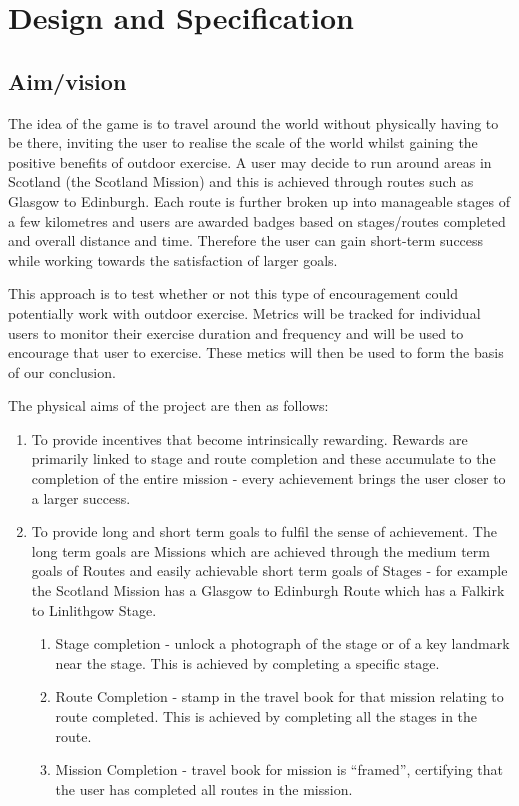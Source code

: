 \chapter{Design and Specification}\label{ch_method}

\section{Aim/vision}

The idea of the game is to travel around the world without physically
having to be there, inviting the user to realise the scale of the
world whilst gaining the positive benefits of outdoor exercise. A user
may decide to run around areas in Scotland (the Scotland Mission) and
this is achieved through routes such as Glasgow to Edinburgh. Each
route is further broken up into manageable stages of a few kilometres
and users are awarded badges based on stages/routes completed and
overall distance and time. Therefore the user can gain short-term
success while working towards the satisfaction of larger goals. 

This approach is to test whether or not this type of encouragement
could potentially work with outdoor exercise. Metrics will be tracked
for individual users to monitor their exercise duration and frequency
and will be used to encourage that user to exercise. These metics will
then be used to form the basis of our conclusion.



The physical aims of the project are then as follows:

\begin{enumerate}
  \item To provide incentives that become intrinsically
    rewarding. Rewards are primarily linked to stage and route 
    completion and these accumulate to the completion of the entire
    mission - every achievement brings the user closer to a larger
    success. 
  \item To provide long and short term goals to fulfil the sense of
    achievement. The long term goals are Missions which are achieved
    through the medium term goals of Routes and easily achievable
    short term goals of Stages - for example
    the Scotland Mission has a Glasgow to Edinburgh Route which has a
    Falkirk to Linlithgow Stage.
    \begin{enumerate}
      \item Stage completion - unlock a photograph of the stage or of
        a key landmark near the stage. This is achieved by completing
        a specific stage.
      \item Route Completion - stamp in the travel book for that
        mission relating to route completed. This is achieved by
        completing all the stages in the route.
      \item Mission Completion - travel book for mission is
        ``framed'', certifying that the user has completed all routes
        in the mission.
    \end{enumerate}
\end{enumerate}


